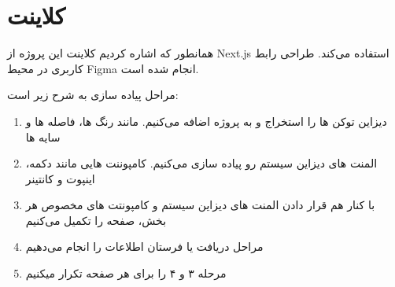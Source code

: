 
\section{کلاینت}
همانطور که اشاره کردیم کلاینت این پروژه از Next.js استفاده می‌کند.
طراحی رابط کاربری در محیط Figma انجام شده است.


مراحل پیاده سازی به شرح زیر است:
\begin{enumerate}
    \item دیزاین توکن ها را استخراج و به پروژه اضافه می‌کنیم. مانند رنگ ها، فاصله ها و سایه ها
    \item المنت های دیزاین سیستم رو پیاده سازی می‌کنیم. کامپوننت هایی مانند دکمه، اینپوت و کانتینر
    \item با کنار هم قرار دادن المنت های دیزاین سیستم و کامپونتت های مخصوص هر بخش، صفحه را تکمیل می‌کنیم
    \item مراحل دریافت یا فرستان اطلاعات را انجام می‌دهیم
    \item مرحله ۳ و ۴ را برای هر صفحه تکرار میکنیم
\end{enumerate}

